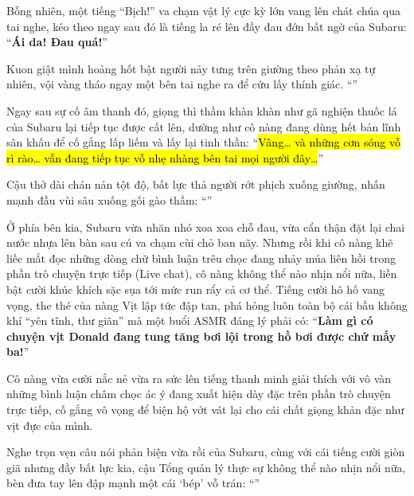 \documentclass[../main.tex]{subfiles}
\begin{document}
Bỗng nhiên, một tiếng ``Bịch!'' va chạm vật lý cực kỳ lớn vang lên chát chúa qua tai nghe, kéo theo ngay sau đó là tiếng la ré lên đầy đau đớn bất ngờ của Subaru: ``\textbf{Ái da! Đau quá!}''

Kuon giật mình hoảng hốt bật người nảy tưng trên giường theo phản xạ tự nhiên, vội vàng tháo ngay một bên tai nghe ra để cứu lấy thính giác. ``\textit{}''

Ngay sau sự cố âm thanh đó, giọng thì thầm khàn khàn như gã nghiện thuốc lá của Subaru lại tiếp tục được cất lên, dường như cô nàng đang dùng hết bản lĩnh sân khấu để cố gắng lấp liếm và lấy lại tinh thần: ``\hl{Vâng\dots{} và những cơn sóng vỗ rì rào\dots{} vẫn đang tiếp tục vỗ nhẹ nhàng bên tai mọi người đây\dots}''

Cậu thở dài chán nản tột độ, bất lực thả người rớt phịch xuống giường, nhấn mạnh đầu vùi sâu xuống gối gào thầm: ``\textit{}''

\il

Ở phía bên kia, Subaru vừa nhăn nhó xoa xoa chỗ đau, vừa cẩn thận đặt lại chai nước nhựa lên bàn sau cú va chạm cùi chỏ ban nãy. Nhưng rồi khi cô nàng khẽ liếc mắt đọc những dòng chữ bình luận trêu chọc đang nhảy múa liên hồi trong phần trò chuyện trực tiếp (Live chat), cô nàng không thể nào nhịn nổi nữa, liền bật cười khúc khích sặc sụa tới mức run rẩy cả cơ thể. Tiếng cười hô hố vang vọng, the thé của nàng Vịt lập tức đập tan, phá hỏng luôn toàn bộ cái bầu không khí ``yên tĩnh, thư giãn'' mà một buổi ASMR đáng lý phải có: ``\textbf{Làm gì có chuyện vịt Donald đang tung tăng bơi lội trong hồ bơi được chứ mấy ba!}''


Cô nàng vừa cười nắc nẻ vừa ra sức lên tiếng thanh minh giải thích với vô vàn những bình luận châm chọc ác ý đang xuất hiện dày đặc trên phần trò chuyện trực tiếp, cố gắng vô vọng để biện hộ vớt vát lại cho cái chất giọng khản đặc như vịt đực của mình.

\il

Nghe trọn vẹn câu nói phản biện vừa rồi của Subaru, cùng với cái tiếng cười giòn giã nhưng đầy bất lực kia, cậu Tổng quản lý thực sự không thể nào nhịn nổi nữa, bèn đưa tay lên đập mạnh một cái `bép' vỗ trán: ``\textit{}''
\end{document}
